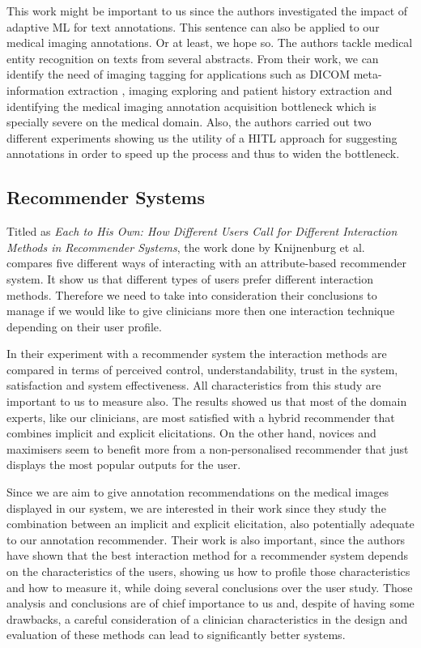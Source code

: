 This work might be important to us since the authors investigated the impact of adaptive ML for text annotations. This sentence can also be applied to our medical imaging annotations. Or at least, we hope so. The authors tackle medical entity recognition on texts from several abstracts. From their work, we can identify the need of imaging tagging for applications such as DICOM meta-information extraction \cite{vizza2016annotation}, imaging exploring and patient history extraction \cite{han2015texture} and identifying the medical imaging annotation acquisition bottleneck which is specially severe on the medical domain. Also, the authors carried out two different experiments showing us the utility of a HITL approach for suggesting annotations in order to speed up the process and thus to widen the bottleneck.

\subsection{Recommender Systems}

Titled as \textit{Each to His Own: How Different Users Call for Different Interaction Methods in Recommender Systems}, the work done by Knijnenburg et al. \cite{knijnenburg2011each} compares five different ways of interacting with an attribute-based recommender system. It show us that different types of users prefer different interaction methods. Therefore we need to take into consideration their conclusions to manage if we would like to give clinicians more then one interaction technique depending on their user profile.

In their experiment with a recommender system the interaction methods are compared in terms of perceived control, understandability, trust in the system, satisfaction and system effectiveness. All characteristics from this study are important to us to measure also. The results showed us that most of the domain experts, like our clinicians, are most satisfied with a hybrid recommender that combines implicit and explicit elicitations. On the other hand, novices and maximisers seem to benefit more from a non-personalised recommender that just displays the most popular outputs for the user.

Since we are aim to give annotation recommendations on the medical images displayed in our system, we are interested in their work since they study the combination between an implicit and explicit elicitation, also potentially adequate to our annotation recommender. Their work is also important, since the authors have shown that the best interaction method for a recommender system depends on the characteristics of the users, showing us how to profile those characteristics and how to measure it, while doing several conclusions over the user study. Those analysis and conclusions are of chief importance to us and, despite of having some drawbacks, a careful consideration of a clinician characteristics in the design and evaluation of these methods can lead to significantly better systems.















